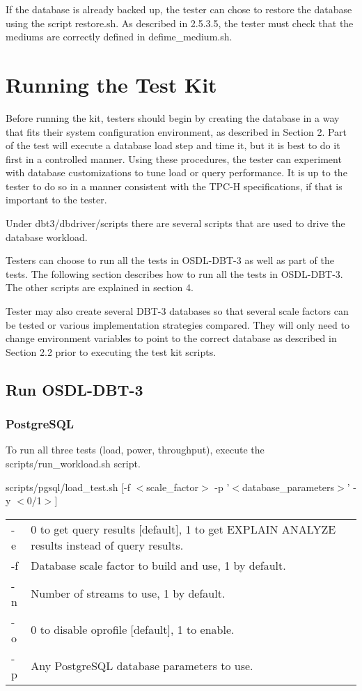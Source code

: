 \documentclass{article}
\begin{document}
\noindent
If the database is already backed up, the tester can chose to restore
the database using the script restore.sh.  As described in 2.5.3.5,
the tester must check that the mediums are correctly defined in
defime\_medium.sh.

\section{Running the Test Kit}

\noindent
Before running the kit, testers should begin by creating the
database in a way that fits their system configuration environment,
as described in Section 2.  Part of the test will execute a database
load step and time it, but it is best to do it first in a controlled
manner.  Using these procedures, the tester can experiment with
database customizations to tune load or query performance.  It is up
to the tester to do so in a manner consistent with the TPC-H
specifications, if that is important to the tester.

\noindent
Under dbt3/dbdriver/scripts there are several scripts that are used
to drive the database workload.

\noindent
Testers can choose to run all the tests in OSDL-DBT-3 as well as part
of the tests.  The following section describes how to run all the
tests in OSDL-DBT-3.  The other scripts  are explained in section 4.

\noindent
Tester may also create several DBT-3 databases so that several scale
factors can be tested or various implementation strategies compared.
They will only need to change environment variables to point to the
correct database as described in Section 2.2 prior to executing the
test kit scripts.

\subsection{Run OSDL-DBT-3}

\subsubsection{PostgreSQL}

\noindent
To run all three tests (load, power, throughput), execute the
scripts/run\_workload.sh script.

\noindent
scripts/pgsql/load\_test.sh [-f $<$scale\_factor$>$ -p '$<$database\_parameters$>$' -y $<$0/1$>$]
\begin{tabular}[c]{ll} 
-e      & 0 to get query results [default], 1 to get EXPLAIN ANALYZE results instead of query results. \\
-f      & Database scale factor to build and use, 1 by default. \\
-n      & Number of streams to use, 1 by default. \\
-o      & 0 to disable oprofile [default], 1 to enable. \\
-p      & Any PostgreSQL database parameters to use. \\
\end{tabular}
\end{document}
